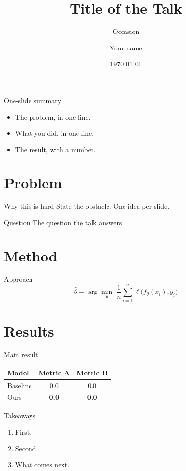 \documentclass[aspectratio=169]{beamer}
\title{Title of the Talk}
\subtitle{Occasion}
\author{Your name}
\institute{Affiliation}
\date{\today}
\begin{document}
\begin{frame}
  \titlepage
\end{frame}

\begin{frame}{One-slide summary}
  \begin{itemize}
    \item The problem, in one line.
    \item What you did, in one line.
    \item The result, with a number.
  \end{itemize}
\end{frame}

\section{Problem}

\begin{frame}{Why this is hard}
  State the obstacle. One idea per slide.
  \pause
  \begin{block}{Question}
    The question the talk answers.
  \end{block}
\end{frame}

\section{Method}

\begin{frame}{Approach}
  \[
    \hat{\theta} = \arg\min_{\theta} \; \frac{1}{n} \sum_{i=1}^{n} \ell\bigl( f_\theta(x_i), y_i \bigr)
  \]
\end{frame}

\section{Results}

\begin{frame}{Main result}
  \centering
  \begin{tabular}{lcc}
    \toprule
    Model & Metric A & Metric B \\
    \midrule
    Baseline & 0.0 & 0.0 \\
    Ours & \textbf{0.0} & \textbf{0.0} \\
    \bottomrule
  \end{tabular}
\end{frame}

\begin{frame}{Takeaways}
  \begin{enumerate}
    \item First.
    \item Second.
    \item What comes next.
  \end{enumerate}
\end{frame}
\end{document}
